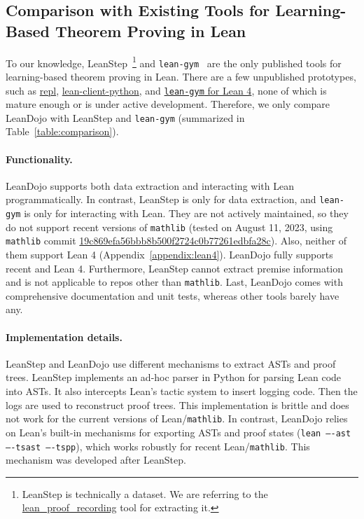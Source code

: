 \documentclass{article}
\newcommand{\smallsec}[1]{\vspace{-1mm} \paragraph{#1.}}
\begin{document}
\subsection{Comparison with Existing Tools for Learning-Based Theorem Proving in Lean}
\label{appendix:tool_comparison}

To our knowledge, LeanStep~\cite{han2022proof}\footnote{LeanStep is technically a dataset. We are referring to the \href{https://github.com/jasonrute/lean_proof_recording}{lean\_proof\_recording} tool for extracting it.} and \texttt{lean-gym}~\cite{polu2023formal} are the only published tools for learning-based theorem proving in Lean. There are a few unpublished prototypes, such as \href{https://github.com/leanprover-community/repl}{repl}, \href{https://github.com/leanprover-community/lean-client-python}{lean-client-python}, and \href{https://github.com/dselsam/lean-gym}{\texttt{lean-gym} for Lean 4}, none of which is mature enough or is under active development. Therefore, we only compare LeanDojo with LeanStep and \texttt{lean-gym} (summarized in Table~\ref{table:comparison}).

\smallsec{Functionality}
LeanDojo supports both data extraction and interacting with Lean programmatically. In contrast, LeanStep is only for data extraction, and \texttt{lean-gym} is only for interacting with Lean. They are not actively maintained, so they do not support recent versions of \texttt{mathlib} (tested on August 11, 2023, using \texttt{mathlib} commit \href{https://github.com/leanprover-community/mathlib/tree/19c869efa56bbb8b500f2724c0b77261edbfa28c}{19c869efa56bbb8b500f2724c0b77261edbfa28c}). Also, neither of them support Lean 4 (Appendix~\ref{appendix:lean4}). LeanDojo fully supports recent  and Lean 4. Furthermore, LeanStep cannot extract premise information and is not applicable to repos other than \texttt{mathlib}. Last, LeanDojo comes with comprehensive documentation and unit tests, whereas other tools barely have any.

\smallsec{Implementation details}
LeanStep and LeanDojo use different mechanisms to extract ASTs and proof trees. LeanStep implements an ad-hoc parser in Python for parsing Lean code into ASTs. It also intercepts Lean's tactic system to insert logging code. Then the logs are used to reconstruct proof trees. This implementation is brittle and does not work for the current versions of Lean/\texttt{mathlib}. In contrast, LeanDojo relies on Lean’s built-in mechanisms for exporting ASTs and proof states (\texttt{lean ----ast ----tsast ----tspp}), which works robustly for recent Lean/\texttt{mathlib}. This mechanism was developed after LeanStep.
\end{document}
